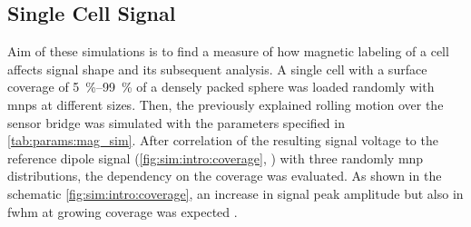 \subsection{Single Cell Signal}
Aim of these simulations is to find a measure of how magnetic labeling of a cell affects signal shape and its subsequent analysis. A single cell with a surface coverage of \SIrange{5}{99}{\percent} of a densely packed sphere was loaded randomly with \glspl{mnp} at different sizes. Then, the previously explained rolling motion over the sensor bridge was simulated with the parameters specified in \cref{tab:params:mag_sim}. After correlation of the resulting signal voltage to the reference dipole signal (\cref{fig:sim:intro:coverage}, \blueCircle) with three randomly \gls{mnp} distributions, the dependency on the coverage was evaluated. As shown in the schematic \cref{fig:sim:intro:coverage}, an increase in signal peak amplitude but also in \gls{fwhm} at growing coverage was expected . 
\begin{figure}[ht!]
	\centering
	\begin{minipage}[t]{.24\linewidth}
	\end{minipage}%
	\hfill
	\begin{minipage}[b]{.7\linewidth}
		\addtocounter{subfigure}{-1}
		\\
		\vspace{\baselineskip}	
		\addtocounter{subfigure}{-1}
	\end{minipage}%
	\label{fig:sim:intro}	
\end{figure}
